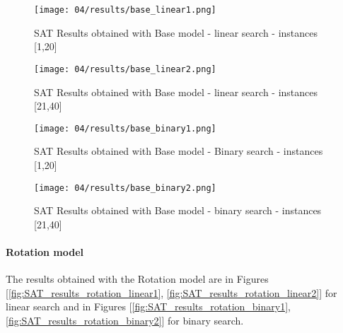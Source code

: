   \pagebreak
  \begin{figure}[H]
    \centering
    \texttt{[image: 04/results/base\_linear1.png]}
    \caption{
      SAT Results obtained with Base model - linear search - instances [1,20]
    }
    \label{fig:SAT_results_base_linear1}
  \end{figure}
  \begin{figure}[H]
    \centering
    \texttt{[image: 04/results/base\_linear2.png]}
    \caption{
      SAT Results obtained with Base model - linear search - instances [21,40]
    }
    \label{fig:SAT_results_base_linear2}
  \end{figure}    

  \begin{figure}[H]
    \centering
    \texttt{[image: 04/results/base\_binary1.png]}
    \caption{
      SAT Results obtained with Base model - Binary search - instances [1,20]
    }
    \label{fig:SAT_results_base_binary1}
  \end{figure}
  \begin{figure}[H]
    \centering
    \texttt{[image: 04/results/base\_binary2.png]}
    \caption{
      SAT Results obtained with Base model - binary search - instances [21,40]
    }
    \label{fig:SAT_results_base_binary2}
  \end{figure} 
  

  \paragraph{Rotation model}
  The results obtained with the Rotation model are in Figures [\ref{fig:SAT_results_rotation_linear1}, \ref{fig:SAT_results_rotation_linear2}]
  for linear search and in Figures [\ref{fig:SAT_results_rotation_binary1}, \ref{fig:SAT_results_rotation_binary2}] for binary search.
  
